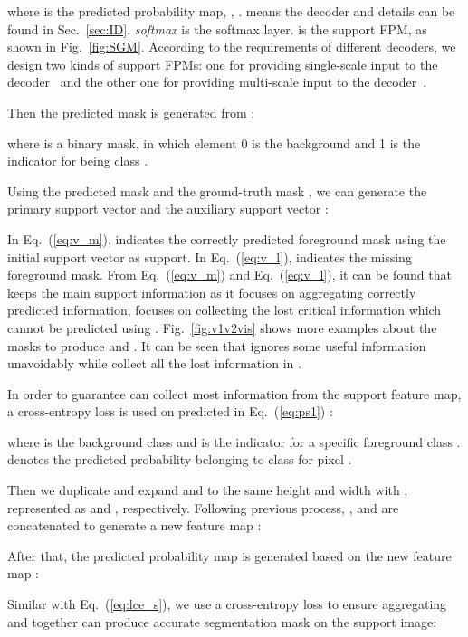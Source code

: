 \documentclass[final]{cvpr}
\begin{document}
where  is the predicted probability map, \ie, .  means the decoder and details can be found in Sec.~\ref{sec:ID}. \emph{softmax} is the softmax layer.  is the support FPM, as shown in Fig.~\ref{fig:SGM}. According to the requirements of different decoders, we design two kinds of support FPMs: one for providing single-scale input to the decoder~\cite{zhang2019canet,yang2020new} and the other one for providing multi-scale input to the decoder~\cite{tian2020prior}. 

Then the predicted mask is generated from :

where  is a binary mask, in which element 0 is the background and 1 is the indicator for being class .

Using the predicted mask  and the ground-truth mask , we can generate the primary support vector  and the auxiliary support vector :



In Eq.~(\ref{eq:v_m}),  indicates the correctly predicted foreground mask using the initial support vector  as support. In Eq.~(\ref{eq:v_l}),  indicates the missing foreground mask. From Eq.~(\ref{eq:v_m}) and Eq.~(\ref{eq:v_l}), it can be found that  keeps the main support information as it focuses on aggregating correctly predicted information,  focuses on collecting the lost critical information which cannot be predicted using . Fig.~\ref{fig:v1v2vis} shows more examples about the masks to produce  and . It can be seen that  ignores some useful information unavoidably while  collect all the lost information in .

In order to guarantee  can collect most information from the support feature map, a cross-entropy loss is used on  predicted in Eq.~(\ref{eq:ps1}) :

where  is the background class and  is the indicator for a specific foreground class .  denotes the predicted probability belonging to class  for pixel . 

Then we duplicate and expand  and  to the same height and width with , represented as  and , respectively. Following previous process, ,  and  are concatenated to generate a new feature map :


After that, the predicted probability map  is generated based on the new feature map : 
 

Similar with Eq.~(\ref{eq:lce_s}), we use a cross-entropy loss to ensure aggregating  and  together can produce accurate segmentation mask on the support image:
\end{document}
